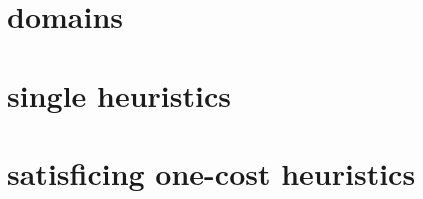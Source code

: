 \section{domains}
\label{sec-1}

\section{single heuristics}
\label{sec-2}

\section{satisficing one-cost heuristics}
\label{sec-3}
